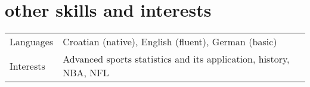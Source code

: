 \documentclass[a4paper]{article}
\makeatletter
\newlength{\tablewidth}
\newenvironment{skills}{%
\setlength{\tablewidth}{\linewidth}
\addtolength{\tablewidth}{-2\tabcolsep}
\begin{tabular}{@{}p{0.15\tablewidth}p{0.85\tablewidth}@{}}
}{%
\end{tabular}
}
\makeatother
\begin{document}

\section{other skills and interests}
\begin{skills}
	Languages & Croatian (native), English (fluent), German (basic) \\
	Interests & Advanced sports statistics and its application, history, NBA, NFL \\
\end{skills}
\end{document}
